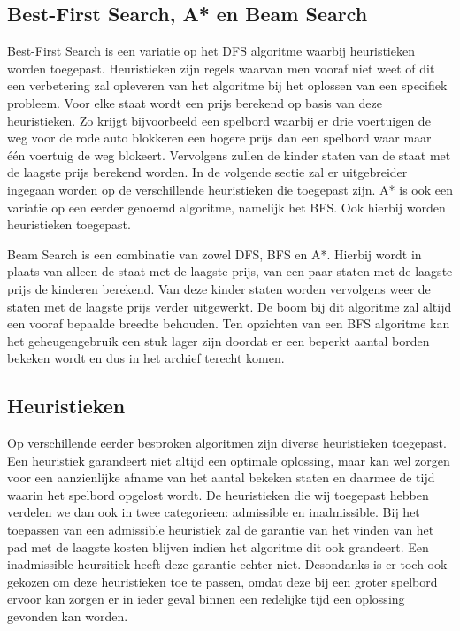 \documentclass[a4paper]{article}
\begin{document}
\subsection{Best-First Search, A* en Beam Search}
Best-First Search is een variatie op het DFS algoritme waarbij heuristieken worden toegepast. Heuristieken zijn regels waarvan men vooraf niet weet of dit een verbetering zal opleveren van het algoritme bij het oplossen van een specifiek probleem. Voor elke staat wordt een prijs berekend op basis van deze heuristieken. Zo krijgt bijvoorbeeld een spelbord waarbij er drie voertuigen de weg voor de rode auto blokkeren een hogere prijs dan een spelbord waar maar één voertuig de weg blokeert. Vervolgens zullen de kinder staten van de staat met de laagste prijs berekend worden. In de volgende sectie zal er uitgebreider ingegaan worden op de verschillende heuristieken die toegepast zijn. A* is ook een variatie op een eerder genoemd algoritme, namelijk het BFS. Ook hierbij worden heuristieken toegepast.
	
    Beam Search is een combinatie van zowel DFS, BFS en A*. Hierbij wordt in plaats van alleen de staat met de laagste prijs, van een paar staten met de laagste prijs de kinderen berekend. Van deze kinder staten worden vervolgens weer de staten met de laagste prijs verder uitgewerkt. De boom bij dit algoritme zal altijd een vooraf bepaalde breedte behouden. Ten opzichten van een BFS algoritme kan het geheugengebruik een stuk lager zijn doordat er een beperkt aantal borden bekeken wordt en dus in het archief terecht komen.

\subsection{Heuristieken}
Op verschillende eerder besproken algoritmen zijn diverse heuristieken toegepast. Een heuristiek garandeert niet altijd een optimale oplossing, maar kan wel zorgen voor een aanzienlijke afname van het aantal bekeken staten en daarmee de tijd waarin het spelbord opgelost wordt. De heuristieken die wij toegepast hebben verdelen we dan ook in twee categorieen: admissible en inadmissible. Bij het toepassen van een admissible heuristiek zal de garantie van het vinden van het pad met de laagste kosten blijven indien het algoritme dit ook grandeert. Een inadmissible heursitiek heeft deze garantie echter niet. Desondanks is er toch ook gekozen om deze heuristieken toe te passen, omdat deze bij een groter spelbord ervoor kan zorgen er in ieder geval binnen een redelijke tijd een oplossing gevonden kan worden.
	
\end{document}
